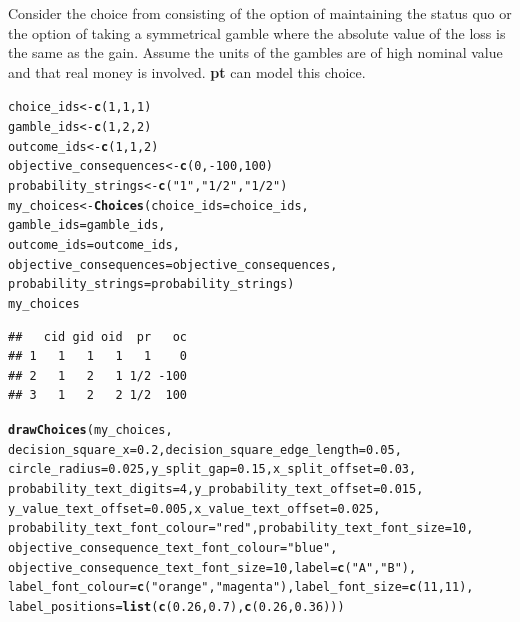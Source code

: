 \documentclass{article}\usepackage[]{graphicx}\usepackage[]{color}
\makeatletter
\newcommand{\hlnum}[1]{\textcolor[rgb]{0.686,0.059,0.569}{#1}}%
\newcommand{\hlstr}[1]{\textcolor[rgb]{0.192,0.494,0.8}{#1}}%
\newcommand{\hlopt}[1]{\textcolor[rgb]{0,0,0}{#1}}%
\newcommand{\hlstd}[1]{\textcolor[rgb]{0.345,0.345,0.345}{#1}}%
\newcommand{\hlkwb}[1]{\textcolor[rgb]{0.69,0.353,0.396}{#1}}%
\newcommand{\hlkwc}[1]{\textcolor[rgb]{0.333,0.667,0.333}{#1}}%
\newcommand{\hlkwd}[1]{\textcolor[rgb]{0.737,0.353,0.396}{\textbf{#1}}}%
\newenvironment{kframe}{%
 \def\at@end@of@kframe{}%
 \ifinner\ifhmode%
  \def\at@end@of@kframe{\end{minipage}}%
  \begin{minipage}{\columnwidth}%
 \fi\fi%
 \def\FrameCommand##1{\hskip\@totalleftmargin \hskip-\fboxsep
 \colorbox{shadecolor}{##1}\hskip-\fboxsep
     \hskip-\linewidth \hskip-\@totalleftmargin \hskip\columnwidth}%
 \MakeFramed {\advance\hsize-\width
   \@totalleftmargin\z@ \linewidth\hsize
   \@setminipage}}%
 {\par\unskip\endMakeFramed%
 \at@end@of@kframe}
\newenvironment{knitrout}{}{} %
\makeatother
\begin{document}
Consider the choice from \citet[][Table 5 p. 221]{Erev_2013} consisting of the option of maintaining the status quo or the option of taking a symmetrical gamble where the absolute value of the loss is the same as the gain. Assume the units of the gambles are of high nominal value and that real money is involved. {\bf pt} can model this choice.

\begin{knitrout}
\color{fgcolor}\begin{kframe}
\begin{alltt}
\hlstd{choice_ids} \hlkwb{<-} \hlkwd{c}\hlstd{(}\hlnum{1}\hlstd{,} \hlnum{1}\hlstd{,} \hlnum{1}\hlstd{)}
\hlstd{gamble_ids} \hlkwb{<-} \hlkwd{c}\hlstd{(}\hlnum{1}\hlstd{,} \hlnum{2}\hlstd{,} \hlnum{2}\hlstd{)}
\hlstd{outcome_ids} \hlkwb{<-} \hlkwd{c}\hlstd{(}\hlnum{1}\hlstd{,} \hlnum{1}\hlstd{,} \hlnum{2}\hlstd{)}
\hlstd{objective_consequences} \hlkwb{<-} \hlkwd{c}\hlstd{(}\hlnum{0}\hlstd{,} \hlopt{-}\hlnum{100}\hlstd{,} \hlnum{100}\hlstd{)}
\hlstd{probability_strings} \hlkwb{<-} \hlkwd{c}\hlstd{(}\hlstr{"1"}\hlstd{,} \hlstr{"1/2"}\hlstd{,} \hlstr{"1/2"}\hlstd{)}
\hlstd{my_choices} \hlkwb{<-} \hlkwd{Choices}\hlstd{(}\hlkwc{choice_ids}\hlstd{=choice_ids,}
        \hlkwc{gamble_ids}\hlstd{=gamble_ids,}
        \hlkwc{outcome_ids}\hlstd{=outcome_ids,}
        \hlkwc{objective_consequences}\hlstd{=objective_consequences,}
        \hlkwc{probability_strings}\hlstd{=probability_strings)}
\hlstd{my_choices}
\end{alltt}
\begin{verbatim}
##   cid gid oid  pr   oc
## 1   1   1   1   1    0
## 2   1   2   1 1/2 -100
## 3   1   2   2 1/2  100
\end{verbatim}
\begin{alltt}
\hlkwd{drawChoices}\hlstd{(my_choices,}
        \hlkwc{decision_square_x}\hlstd{=}\hlnum{0.2}\hlstd{,} \hlkwc{decision_square_edge_length}\hlstd{=}\hlnum{0.05}\hlstd{,}
        \hlkwc{circle_radius}\hlstd{=}\hlnum{0.025}\hlstd{,} \hlkwc{y_split_gap}\hlstd{=}\hlnum{0.15}\hlstd{,} \hlkwc{x_split_offset}\hlstd{=}\hlnum{0.03}\hlstd{,}
        \hlkwc{probability_text_digits}\hlstd{=}\hlnum{4}\hlstd{,} \hlkwc{y_probability_text_offset}\hlstd{=}\hlnum{0.015}\hlstd{,}
        \hlkwc{y_value_text_offset}\hlstd{=}\hlnum{0.005}\hlstd{,} \hlkwc{x_value_text_offset}\hlstd{=}\hlnum{0.025}\hlstd{,}
        \hlkwc{probability_text_font_colour}\hlstd{=}\hlstr{"red"}\hlstd{,} \hlkwc{probability_text_font_size}\hlstd{=}\hlnum{10}\hlstd{,}
        \hlkwc{objective_consequence_text_font_colour}\hlstd{=}\hlstr{"blue"}\hlstd{,}
        \hlkwc{objective_consequence_text_font_size}\hlstd{=}\hlnum{10}\hlstd{,} \hlkwc{label}\hlstd{=}\hlkwd{c}\hlstd{(}\hlstr{"A"}\hlstd{,}\hlstr{"B"}\hlstd{),}
        \hlkwc{label_font_colour}\hlstd{=}\hlkwd{c}\hlstd{(}\hlstr{"orange"}\hlstd{,}\hlstr{"magenta"}\hlstd{),} \hlkwc{label_font_size}\hlstd{=}\hlkwd{c}\hlstd{(}\hlnum{11}\hlstd{,}\hlnum{11}\hlstd{),}
        \hlkwc{label_positions}\hlstd{=}\hlkwd{list}\hlstd{(}\hlkwd{c}\hlstd{(}\hlnum{0.26}\hlstd{,}\hlnum{0.7}\hlstd{),}\hlkwd{c}\hlstd{(}\hlnum{0.26}\hlstd{,}\hlnum{0.36}\hlstd{)))}
\end{alltt}
\end{kframe}


\end{knitrout}
\end{document}
